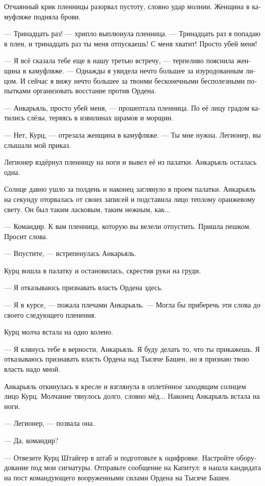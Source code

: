 \documentclass[a4paper,12pt,fleqn]{book}\usepackage{polyglossia}\setdefaultlanguage[babelshorthands=true]{russian}\setotherlanguage{english}\defaultfontfeatures{Ligatures=TeX,Mapping=tex-text}\usepackage{xcolor}\newcommand{\ml}[3]{#2}
\begin{document}
Отчаянный крик пленницы разорвал пустоту, словно удар молнии.
Женщина в камуфляже подняла брови.

--- Тринадцать раз! --- хрипло выплюнула пленница.
--- Тринадцать раз я попадаю в плен, и тринадцать раз ты меня отпускаешь!
С меня хватит!
Просто убей меня!

--- Я всё сказала тебе еще в нашу третью встречу, --- терпеливо пояснила женщина в камуфляже.
--- Однажды я увидела нечто большее за изуродованным лицом.
И сейчас я вижу нечто большее за твоими бесконечными бесполезными попытками организовать восстание против Ордена.

--- Анкарьяль, просто убей меня, --- прошептала пленница.
По её лицу градом катились слёзы, теряясь в извилинах шрамов и морщин.

--- Нет, Курц, --- отрезала женщина в камуфляже.
--- Ты мне нужна.
Легионер, вы слышали мой приказ.

Легионер вздёрнул пленницу на ноги и вывел её из палатки.
Анкарьяль осталась одна.

Солнце давно ушло за полдень и наконец заглянуло в проем палатки.
Анкарьяль на секунду оторвалась от своих записей и подставила лицо теплому оранжевому свету.
Он был таким ласковым, таким нежным, как...

--- Командир.
К вам пленница, которую вы велели отпустить.
Пришла пешком.
Просит слова.

--- Впустите, --- встрепенулась Анкарьяль.

Курц вошла в палатку и остановилась, скрестив руки на груди.

--- Я отказываюсь признавать власть Ордена здесь.

--- Я в курсе, --- пожала плечами Анкарьяль.
--- Могла бы приберечь эти слова до своего следующего пленения.

Курц молча встала на одно колено.

--- Я клянусь тебе в верности, Анкарьяль.
Я буду делать то, что ты прикажешь.
Я отказываюсь признавать власть Ордена над Тысяче Башен, но я признаю твою власть надо мной.

Анкарьяль откинулась в кресле и взглянула в оплетённое заходящим солнцем лицо Курц.
Молчание тянулось долго, словно мёд...
Наконец Анкарьяль встала на ноги.

--- Легионер, --- позвала она.

--- Да, командир?

--- Отвезите Курц Штайгер в штаб и подготовьте к оцифровке.
Настройте оборудование под мои сигнатуры.
Отправьте сообщение на Капитул: я нашла кандидата на пост командующего вооруженными силами Ордена на Тысяче Башен.
\end{document}
